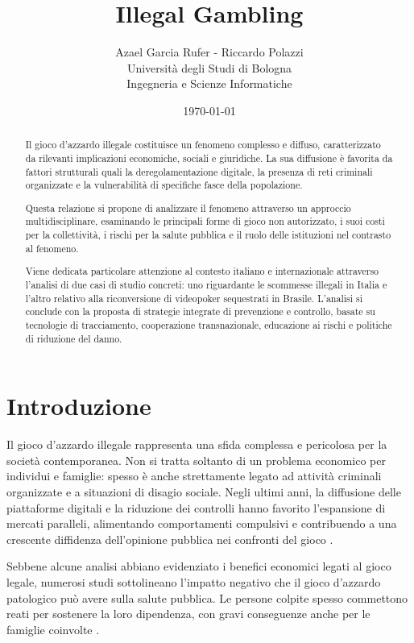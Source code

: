 \documentclass[a4paper,12pt]{article}
\title{\textbf{Illegal Gambling}}
\author{Azael Garcia Rufer - Riccardo Polazzi \\ Università degli Studi di Bologna \\ Ingegneria e Scienze Informatiche}
\date{\today}
\begin{document}
\maketitle

\begin{abstract}
    Il gioco d’azzardo illegale costituisce un fenomeno complesso e diffuso, caratterizzato da rilevanti implicazioni economiche, sociali e giuridiche. La sua diffusione è favorita da fattori strutturali quali la deregolamentazione digitale, la presenza di reti criminali organizzate e la vulnerabilità di specifiche fasce della popolazione.

    Questa relazione si propone di analizzare il fenomeno attraverso un approccio multidisciplinare, esaminando le principali forme di gioco non autorizzato, i suoi costi per la collettività, i rischi per la salute pubblica e il ruolo delle istituzioni nel contrasto al fenomeno.
    
    Viene dedicata particolare attenzione al contesto italiano e internazionale attraverso l’analisi di due casi di studio concreti: uno riguardante le scommesse illegali in Italia e l’altro relativo alla riconversione di videopoker sequestrati in Brasile. L’analisi si conclude con la proposta di strategie integrate di prevenzione e controllo, basate su tecnologie di tracciamento, cooperazione transnazionale, educazione ai rischi e politiche di riduzione del danno.
\end{abstract}

\newpage
\tableofcontents
\newpage
\section{Introduzione}

Il gioco d’azzardo illegale rappresenta una sfida complessa e pericolosa per la società contemporanea. Non si tratta soltanto di un problema economico per individui e famiglie: spesso è anche strettamente legato ad attività criminali organizzate e a situazioni di disagio sociale. Negli ultimi anni, la diffusione delle piattaforme digitali e la riduzione dei controlli hanno favorito l’espansione di mercati paralleli, alimentando comportamenti compulsivi e contribuendo a una crescente diffidenza dell’opinione pubblica nei confronti del gioco \cite{banks2018taxonomy}.

Sebbene alcune analisi abbiano evidenziato i benefici economici legati al gioco legale, numerosi studi sottolineano l’impatto negativo che il gioco d’azzardo patologico può avere sulla salute pubblica. Le persone colpite spesso commettono reati per sostenere la loro dipendenza, con gravi conseguenze anche per le famiglie coinvolte \cite{gorsane2017illegalacts, lucchini2022socialcosts}.
\end{document}
